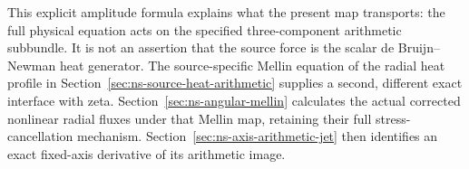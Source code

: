 This explicit amplitude formula explains what the present map
transports: the full physical equation acts on the specified
three-component arithmetic subbundle. It is not an assertion that
the source force is the scalar de Bruijn--Newman heat generator.
The source-specific Mellin equation of the radial heat profile in
Section~\ref{sec:ns-source-heat-arithmetic} supplies a second,
different exact interface with zeta. Section~\ref{sec:ns-angular-mellin}
calculates the actual corrected nonlinear radial fluxes under that
Mellin map, retaining their full stress-cancellation mechanism.
Section~\ref{sec:ns-axis-arithmetic-jet} then identifies an exact
fixed-axis derivative of its arithmetic image.
